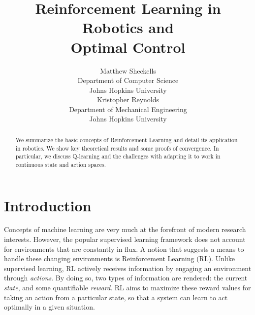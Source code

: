 \documentclass{article} %
\title{Reinforcement Learning in Robotics and  \\ Optimal Control}%
\author{
Matthew Sheckells\\
Department of Computer Science\\
Johns Hopkins University\\
\And
Kristopher Reynolds \\
Department of Mechanical Engineering\\
Johns Hopkins University\\
}
\begin{document}
\maketitle

\begin{abstract}
We summarize the basic concepts of Reinforcement Learning and detail its application in robotics.  We show key theoretical results and some proofs of convergence.  In particular, we discuss Q-learning and the challenges with adapting it to work in continuous state and action spaces.  
\end{abstract}

\section{Introduction}
Concepts of machine learning are very much at the forefront of modern research interests. However, the popular supervised learning framework does not account for environments that are constantly in flux. A notion that suggests a means to handle these changing environments is Reinforcement Learning (RL). Unlike supervised learning, RL actively receives information by engaging an environment through \textit{actions}. By doing so, two types of information are rendered: the current \textit{state}, and some quantifiable \textit{reward}. RL aims to maximize these reward values for taking an action from a particular state, so that a system can learn to act optimally in a given situation.
\end{document}
